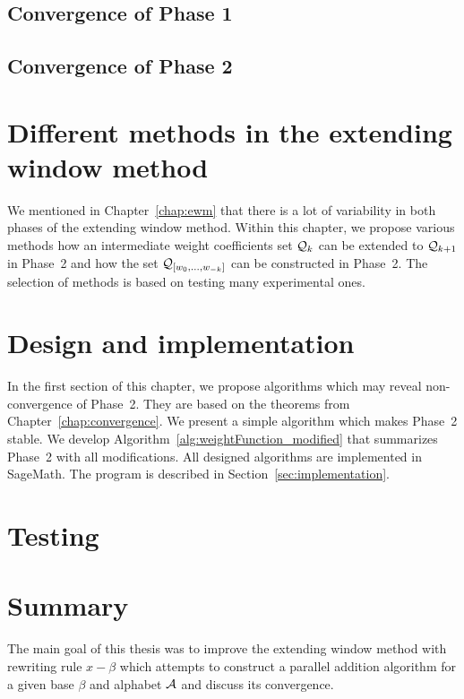 \documentclass[11pt,a4paper]{report}	%
\theoremstyle{definition}
\begin{document}
	\section{Convergence of Phase 1}
	

	\section{Convergence of Phase 2}
	
	

	


\chapter{Different methods in the extending window method}
	\label{chap:diffChoices}
	We mentioned in Chapter~\ref{chap:ewm} that there is a lot of variability in both phases of the extending window method. Within this chapter, we propose various methods how an intermediate weight coefficients set $\mathcal{Q}_k$ can be extended to $\mathcal{Q}_{k+1}$ in Phase~2 and how the set $\mathcal{Q}_{[w_{0}, \dots, w_{-k}]}$ can be constructed in Phase~2. The selection of methods is based on testing many experimental ones. 

	

	

	
	


\chapter{Design and implementation}

In the first section of this chapter, we propose algorithms which may reveal non-convergence of Phase~2. They are based on the theorems from Chapter~\ref{chap:convergence}. We present a simple algorithm which makes Phase~2 stable. We develop Algorithm~\ref{alg:weightFunction_modified} that summarizes  Phase~2 with all modifications. All designed algorithms are implemented in SageMath. The program is described in Section~\ref{sec:implementation}.
\label{chap:design}
	
	

\chapter{Testing}
\label{chap:testing}
	

\chapter*{Summary}
The main goal of this thesis was to improve the extending window method with rewriting rule $x-\beta$ which attempts to construct a parallel addition algorithm for a given base $\beta$ and alphabet $\mathcal{A}$ and discuss its convergence.
\end{document}
